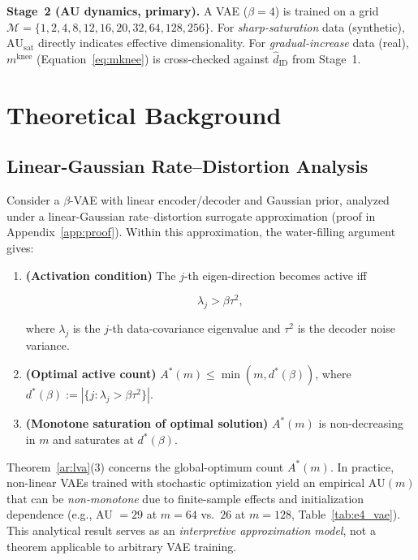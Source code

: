 \documentclass[make,article,submit,pdftex,moreauthors]{Definitions/mdpi}
\newcommand{\AUsat}{\mathrm{AU}_{\mathrm{sat}}}
\newcommand{\mknee}{m^{\mathrm{knee}}}
\newcommand{\hatdID}{\hat{d}_{\mathrm{ID}}}
\begin{document}
\textbf{Stage~2 (AU dynamics, primary).}
A VAE ($\beta = 4$) is trained on a grid
$\mathcal{M} = \{1, 2, 4, 8, 12, 16, 20, 32, 64, 128, 256\}$.
For \emph{sharp-saturation} data (synthetic), $\AUsat$ directly indicates
effective dimensionality.
For \emph{gradual-increase} data (real), $\mknee$ (Equation~\eqref{eq:mknee})
is cross-checked against $\hatdID$ from Stage~1.

\section{Theoretical Background}\label{sec:theory}

\subsection{Linear-Gaussian Rate--Distortion Analysis}

\begin{Theorem}\label{ar:lva}
Consider a $\beta$-VAE with linear encoder/decoder and Gaussian prior,
analyzed under a linear-Gaussian rate--distortion surrogate approximation
(proof in Appendix~\ref{app:proof}).
Within this approximation, the water-filling argument gives:
\begin{enumerate}
\item \textbf{(Activation condition)} The $j$-th eigen-direction becomes
  active iff
  \begin{linenomath}
  \begin{equation}
    \lambda_j > \beta\tau^2,
    \label{eq:au_threshold}
  \end{equation}
  \end{linenomath}
  where $\lambda_j$ is the $j$-th data-covariance eigenvalue and $\tau^2$ is
  the decoder noise variance.
\item \textbf{(Optimal active count)}
  $A^*(m) \leq \min(m, d^*(\beta))$, where
  $d^*(\beta) := |\{j : \lambda_j > \beta\tau^2\}|$.
\item \textbf{(Monotone saturation of optimal solution)}
  $A^*(m)$ is non-decreasing in $m$ and saturates at $d^*(\beta)$.
\end{enumerate}
\end{Theorem}

\begin{Remark}[Scope]\label{rem:scope}
Theorem~\ref{ar:lva}(3) concerns the global-optimum count $A^*(m)$.
In practice, non-linear VAEs trained with stochastic optimization yield
an empirical $\mathrm{AU}(m)$ that can be \emph{non-monotone} due to
finite-sample effects and initialization dependence
(e.g., AU $= 29$ at $m = 64$ vs.\ $26$ at $m = 128$, Table~\ref{tab:e4_vae}).
This analytical result serves as an \emph{interpretive approximation model},
not a theorem applicable to arbitrary VAE training.
\end{Remark}
\end{document}
